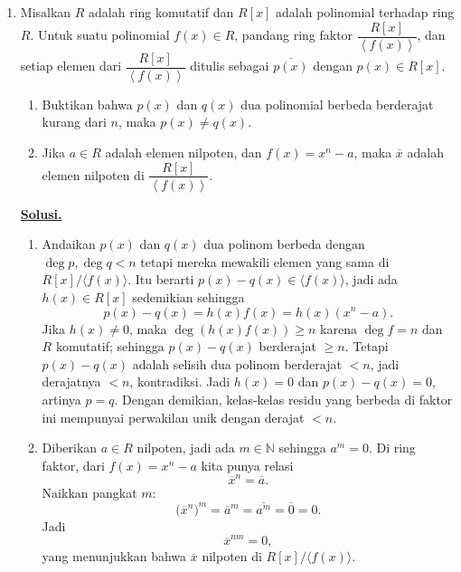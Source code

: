 \documentclass[12pt,twoside]{article}
\newenvironment{solution}
{
	\par\noindent\textbf{\underline{Solusi.}}\\
}
{
	\par
}
\begin{document}
\begin{enumerate}
  \item Misalkan $R$ adalah ring komutatif dan $R[x]$ adalah polinomial terhadap ring $R$. Untuk suatu polinomial $f(x)\in R$, pandang ring faktor $\dfrac{R[x]}{\left<f(x)\right>}$, dan setiap elemen dari $\dfrac{R[x]}{\left<f(x)\right>}$ ditulis sebagai $\overline{p(x)}$ dengan $p(x)\in R[x]$.
        \begin{enumerate}
          \item [(a)] Buktikan bahwa $p(x)$ dan $q(x)$ dua polinomial berbeda berderajat kurang  dari $n$, maka $p(x)\neq q(x)$.
          \item[(b)] Jika $a\in R$ adalah elemen nilpoten, dan $f(x)=x^n-a$, maka $\overline{x}$ adalah elemen nilpoten di $\dfrac{R[x]}{\left<f(x)\right>}$.
        \end{enumerate}
        \begin{solution}
          \vspace*{-1cm}
          \begin{enumerate}
            \item[(a)] Andaikan $p(x)$ dan $q(x)$ dua polinom berbeda dengan $\deg p,\deg q<n$ tetapi mereka mewakili elemen yang sama di $R[x]/\langle f(x)\rangle$. Itu berarti $p(x)-q(x)\in\langle f(x)\rangle$, jadi ada $h(x)\in R[x]$ sedemikian sehingga
                  \[
                    p(x)-q(x)=h(x)f(x)=h(x)(x^n-a).
                  \]
                  Jika $h(x)\ne0$, maka $\deg(h(x)f(x))\ge n$ karena $\deg f=n$ dan $R$ komutatif; sehingga $p(x)-q(x)$ berderajat $\ge n$. Tetapi $p(x)-q(x)$ adalah selisih dua polinom berderajat $<n$, jadi derajatnya $<n$, kontradiksi. Jadi $h(x)=0$ dan $p(x)-q(x)=0$, artinya $p=q$. Dengan demikian, kelas-kelas residu yang berbeda di faktor ini mempunyai perwakilan unik dengan derajat $<n$.

            \item[(b)] Diberikan $a\in R$ nilpoten, jadi ada $m\in\mathbb N$ sehingga $a^m=0$. Di ring faktor, dari $f(x)=x^n-a$ kita punya relasi
                  \[
                    \overline{x}^n=\overline{a}.
                  \]
                  Naikkan pangkat $m$:
                  \[
                    \bigl(\overline{x}^n\bigr)^m=\overline{a}^m=\overline{a^m}=\overline{0}=0.
                  \]
                  Jadi
                  \[
                    \overline{x}^{nm}=0,
                  \]
                  yang menunjukkan bahwa $\overline{x}$ nilpoten di $R[x]/\langle f(x)\rangle$.
          \end{enumerate}
        \end{solution}


\end{enumerate}
\end{document}
